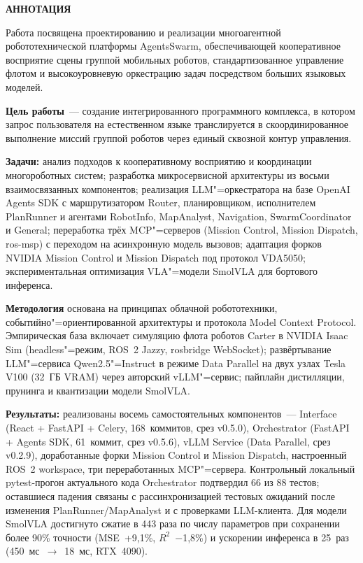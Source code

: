 \documentclass[14pt,a4paper]{extreport}
\begin{document}
\setcounter{page}{1}



\newpage
\thispagestyle{empty}
\begin{center}
  \textbf{АННОТАЦИЯ}
\end{center}
\medskip

Работа посвящена проектированию и реализации многоагентной робототехнической платформы AgentsSwarm, обеспечивающей кооперативное восприятие сцены группой мобильных роботов, стандартизованное управление флотом и высокоуровневую оркестрацию задач посредством больших языковых моделей.

\textbf{Цель работы}~--- создание интегрированного программного комплекса, в котором запрос пользователя на естественном языке транслируется в скоординированное выполнение миссий группой роботов через единый сквозной контур управления.

\textbf{Задачи:} анализ подходов к кооперативному восприятию и координации многороботных систем; разработка микросервисной архитектуры из восьми взаимосвязанных компонентов; реализация LLM"=оркестратора на базе OpenAI Agents SDK с маршрутизатором Router, планировщиком, исполнителем PlanRunner и агентами RobotInfo, MapAnalyst, Navigation, SwarmCoordinator и General; переработка трёх MCP"=серверов (Mission Control, Mission Dispatch, ros-msp) с переходом на асинхронную модель вызовов; адаптация форков NVIDIA Mission Control и Mission Dispatch под протокол VDA5050; экспериментальная оптимизация VLA"=модели SmolVLA для бортового инференса.

\textbf{Методология} основана на принципах облачной робототехники, событийно"=ориентированной архитектуры и протокола Model Context Protocol. Эмпирическая база включает симуляцию флота роботов Carter в NVIDIA Isaac Sim (headless"=режим, ROS~2 Jazzy, rosbridge WebSocket); развёртывание LLM"=сервиса Qwen2.5"=Instruct в режиме Data Parallel на двух узлах Tesla V100 (32~ГБ VRAM) через авторский vLLM"=сервис; пайплайн дистилляции, прунинга и квантизации модели SmolVLA.

\textbf{Результаты:} реализованы восемь самостоятельных компонентов~--- Interface (React + FastAPI + Celery, 168~коммитов, срез v0.5.0), Orchestrator (FastAPI + Agents SDK, 61~коммит, срез v0.5.6), vLLM Service (Data Parallel, срез v0.2.9), доработанные форки Mission Control и Mission Dispatch, настроенный ROS~2 workspace, три переработанных MCP"=сервера. Контрольный локальный pytest-прогон актуального кода Orchestrator подтвердил 66 из 88 тестов; оставшиеся падения связаны с рассинхронизацией тестовых ожиданий после изменения PlanRunner/MapAnalyst и с проверками LLM-клиента. Для модели SmolVLA достигнуто сжатие в 443 раза по числу параметров при сохранении более 90\% точности (MSE~+9{,}1\%, $R^2$~$-$1{,}8\%) и ускорении инференса в 25~раз (450~мс~$\to$~18~мс, RTX~4090).
\end{document}
